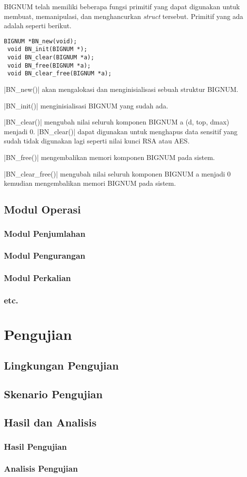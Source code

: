 BIGNUM telah memiliki beberapa fungsi primitif yang dapat digunakan untuk membuat, memanipulasi, dan menghancurkan \textit{struct} tersebut. Primitif yang ada adalah seperti berikut.

\begin{lstlisting}[caption=Primitif BIGNUM]
 BIGNUM *BN_new(void);
 void BN_init(BIGNUM *);
 void BN_clear(BIGNUM *a);
 void BN_free(BIGNUM *a);
 void BN_clear_free(BIGNUM *a);
\end{lstlisting}

|BN_new()| akan mengalokasi dan menginisialisasi sebuah struktur BIGNUM.

|BN_init()| menginisialisasi BIGNUM yang sudah ada.

|BN_clear()| mengubah nilai seluruh komponen BIGNUM a (d, top, dmax) menjadi 0. |BN_clear()| dapat digunakan untuk menghapus data sensitif yang sudah tidak digunakan lagi seperti nilai kunci RSA atau AES.

|BN_free()| mengembalikan memori komponen BIGNUM pada sistem.

|BN_clear_free()| mengubah nilai seluruh komponen BIGNUM a menjadi 0 kemudian mengembalikan memori BIGNUM pada sistem.


\subsection{Modul Operasi}
\subsubsection{Modul Penjumlahan}
\subsubsection{Modul Pengurangan}
\subsubsection{Modul Perkalian}
\subsubsection{etc.}

\section{Pengujian}
\subsection{Lingkungan Pengujian}
\subsection{Skenario Pengujian}
\subsection{Hasil dan Analisis}
\subsubsection{Hasil Pengujian}
\subsubsection{Analisis Pengujian}
